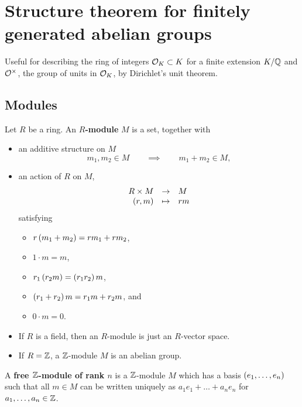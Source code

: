 \pagebreak

\section{Structure theorem for finitely generated abelian groups}


Useful for describing the ring of integers $ \mathcal{O}_K \subset K $ for a finite extension $ K / \mathbb{Q} $ and $ \mathcal{O}^\times $, the group of units in $ \mathcal{O}_K $, by Dirichlet's unit theorem.

\subsection{Modules}

\begin{definition}
Let $ R $ be a ring. An \textbf{$ R $-module} $ M $ is a set, together with
\begin{itemize}
\item an additive structure on $ M $
$$ m_1, m_2 \in M \qquad \implies \qquad m_1 + m_2 \in M, $$
\item an action of $ R $ on $ M $,
$$ \function{R \times M}{M}{\rb{r, m}}{rm} $$
satisfying
\begin{itemize}
\item $ r\left( m_1 + m_2 \right) = rm_1 + rm_2 $,
\item $ 1 \cdot m = m $,
\item $ r_1\left( r_2m \right) = \left( r_1r_2 \right)m $,
\item $ \left( r_1 + r_2 \right)m = r_1m + r_2m $, and
\item $ 0 \cdot m = 0 $.
\end{itemize}
\end{itemize}
\end{definition}

\begin{note*}
\hfill
\begin{itemize}
\item If $ R $ is a field, then an $ R $-module is just an $ R $-vector space.
\item If $ R = \mathbb{Z} $, a $ \mathbb{Z} $-module $ M $ is an abelian group.
\end{itemize}
\end{note*}

\begin{definition}
A \textbf{free $ \mathbb{Z} $-module of rank $ n $} is a $ \mathbb{Z} $-module $ M $ which has a basis $ \left( e_1, \dots, e_n \right) $ such that all $ m \in M $ can be written uniquely as $ a_1e_1 + \dots + a_ne_n $ for $ a_1, \dots, a_n \in \mathbb{Z} $.
\end{definition}


